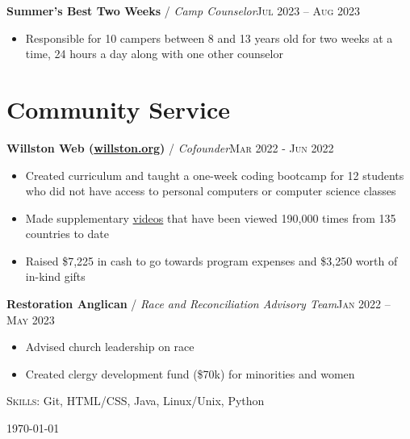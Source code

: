 \documentclass[12pt, a4paper]{article}
\begin{document}
\textbf{Summer's Best Two Weeks} / \textit{Camp Counselor}\hfill\textsc{Jul 2023 -- Aug 2023}\\
\begin{itemize}
    \vspace{-8mm}
    \item Responsible for 10 campers between 8 and 13 years old for two weeks at a time, 24 hours a day along with one other counselor
\end{itemize}

\vspace{-8mm}
\section*{Community Service}
\vspace{-2mm}

\textbf{Willston Web (\href{https://willston.org}{willston.org})} / \textit{Cofounder}\hfill\textsc{Mar 2022 - Jun 2022}\\
\begin{itemize}
    \vspace{-8mm}
    \item Created curriculum and taught a one-week coding bootcamp for 12 students who did not have access to personal computers or computer science classes
    \item Made supplementary \href{https://youtube.com/JonathanBuchh}{videos} that have been viewed 190,000 times from 135 countries to date
    \item Raised \$7,225 in cash to go towards program expenses and \$3,250 worth of in-kind gifts
\end{itemize}

\textbf{Restoration Anglican} / \textit{Race and Reconciliation Advisory Team}\hfill\textsc{Jan 2022 -- May 2023}\\
\begin{itemize}
    \vspace{-8mm}
    \item Advised church leadership on race
    \item Created clergy development fund (\$70k) for minorities and women
\end{itemize}


\textsc{Skills}: Git, HTML/CSS, Java, Linux/Unix, Python\\

\vspace{-6mm}
\begin{center}
{\scriptsize\today\- }
\end{center}
\end{document}
